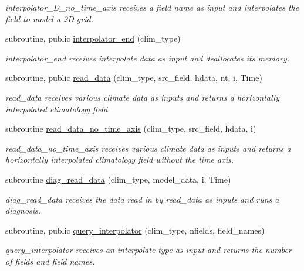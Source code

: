 \begin{DoxyCompactItemize}
\begin{DoxyCompactList}\small\item\em interpolator\+\_\+D\+\_\+no\+\_\+time\+\_\+axis receives a field name as input and interpolates the field to model a 2D grid. \end{DoxyCompactList}\item 
subroutine, public \hyperlink{namespaceinterpolator__mod_a7e435e7e9e550fb380f88f362501faa1}{interpolator\+\_\+end} (clim\+\_\+type)
\begin{DoxyCompactList}\small\item\em interpolator\+\_\+end receives interpolate data as input and deallocates its memory. \end{DoxyCompactList}\item 
subroutine, public \hyperlink{namespaceinterpolator__mod_ac433f8a3533f768e90b7c1bcfc7864f7}{read\+\_\+data} (clim\+\_\+type, src\+\_\+field, hdata, nt, i, Time)
\begin{DoxyCompactList}\small\item\em read\+\_\+data receives various climate data as inputs and returns a horizontally interpolated climatology field. \end{DoxyCompactList}\item 
subroutine \hyperlink{namespaceinterpolator__mod_a8ecd87ad4db593537031aa0fbcf22805}{read\+\_\+data\+\_\+no\+\_\+time\+\_\+axis} (clim\+\_\+type, src\+\_\+field, hdata, i)
\begin{DoxyCompactList}\small\item\em read\+\_\+data\+\_\+no\+\_\+time\+\_\+axis receives various climate data as inputs and returns a horizontally interpolated climatology field without the time axis. \end{DoxyCompactList}\item 
subroutine \hyperlink{namespaceinterpolator__mod_a1c8291f5d841abbe9cee8901503a806c}{diag\+\_\+read\+\_\+data} (clim\+\_\+type, model\+\_\+data, i, Time)
\begin{DoxyCompactList}\small\item\em diag\+\_\+read\+\_\+data receives the data read in by read\+\_\+data as inputs and runs a diagnosis. \end{DoxyCompactList}\item 
subroutine, public \hyperlink{namespaceinterpolator__mod_a048095c591ef4051abfa1da6ebdbf3d9}{query\+\_\+interpolator} (clim\+\_\+type, nfields, field\+\_\+names)
\begin{DoxyCompactList}\small\item\em query\+\_\+interpolator receives an interpolate type as input and returns the number of fields and field names. \end{DoxyCompactList}\item 

\end{DoxyCompactItemize}
